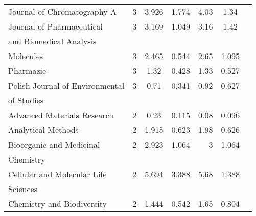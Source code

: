 \begin{longtable}[c]{lcccrcc}
 Journal of Chromatography A                                                        & 3      & 3.926   & 1.774 &  4.03      & 1.34                  \\[0.5ex]
 Journal of Pharmaceutical                                                          & 3      & 3.169   & 1.049 &  3.16      & 1.42                  \\[0.5ex]
 and Biomedical Analysis                                                            &        &         &       &            &                       \\[0.5ex]
 Molecules                                                                          & 3      & 2.465   & 0.544 &  2.65      & 1.095                 \\[0.5ex]
 Pharmazie                                                                          & 3      & 1.32    & 0.428 &  1.33      & 0.527                 \\[0.5ex]
 Polish Journal of Environmental                                                    & 3      & 0.71    & 0.341 &  0.92      & 0.627                 \\[0.5ex]
 of Studies                                                                         &        &         &       &            &                       \\[0.5ex]
 Advanced Materials Research                                                        & 2      & 0.23    & 0.115 &  0.08      & 0.096                 \\[0.5ex]
 Analytical Methods                                                                 & 2      & 1.915   & 0.623 &  1.98      & 0.626                 \\[0.5ex]
 Bioorganic and Medicinal                                                           & 2      & 2.923   & 1.064 &  3         & 1.064                 \\[0.5ex]
 Chemistry                                                                          &        &         &       &            &                       \\[0.5ex]
 Cellular and Molecular Life                                                        & 2      & 5.694   & 3.388 &  5.68      & 1.388                 \\[0.5ex]
 Sciences                                                                           &        &         &       &            &                       \\[0.5ex]
 Chemistry and Biodiversity                                                         & 2      & 1.444   & 0.542 &  1.65      & 0.804                 \\[0.5ex]

\end{longtable}
